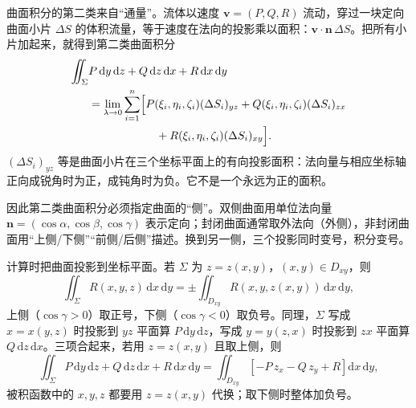 曲面积分的第二类来自“通量”。流体以速度 $\mathbf v=(P,Q,R)$ 流动，穿过一块定向曲面小片 $\Delta S$ 的体积流量，等于速度在法向的投影乘以面积：$\mathbf v\cdot\mathbf n\,\Delta S$。把所有小片加起来，就得到第二类曲面积分
\[
    \begin{aligned}
    \iint_\Sigma &P\,\mathrm dy\,\mathrm dz
    +Q\,\mathrm dz\,\mathrm dx
    +R\,\mathrm dx\,\mathrm dy\\
    &=\lim_{\lambda\to0}\sum_{i=1}^{n}
    \Bigl[P(\xi_i,\eta_i,\zeta_i)(\Delta S_i)_{yz}
    +Q(\xi_i,\eta_i,\zeta_i)(\Delta S_i)_{zx}\\
    &\qquad\qquad\qquad
    +R(\xi_i,\eta_i,\zeta_i)(\Delta S_i)_{xy}\Bigr].
    \end{aligned}
\]
$(\Delta S_i)_{yz}$ 等是曲面小片在三个坐标平面上的有向投影面积：法向量与相应坐标轴正向成锐角时为正，成钝角时为负。它不是一个永远为正的面积。

因此第二类曲面积分必须指定曲面的“侧”。双侧曲面用单位法向量 $\mathbf n=(\cos\alpha,\cos\beta,\cos\gamma)$ 表示定向；封闭曲面通常取外法向（外侧），非封闭曲面用“上侧/下侧”“前侧/后侧”描述。换到另一侧，三个投影同时变号，积分变号。

计算时把曲面投影到坐标平面。若 $\Sigma$ 为 $z=z(x,y)$，$(x,y)\in D_{xy}$，则
\[
    \iint_\Sigma R(x,y,z)\,\mathrm dx\,\mathrm dy
    =\pm\iint_{D_{xy}}R(x,y,z(x,y))\,\mathrm dx\,\mathrm dy ,
\]
上侧（$\cos\gamma>0$）取正号，下侧（$\cos\gamma<0$）取负号。同理，$\Sigma$ 写成 $x=x(y,z)$ 时投影到 $yz$ 平面算 $P\,\mathrm dy\,\mathrm dz$，写成 $y=y(z,x)$ 时投影到 $zx$ 平面算 $Q\,\mathrm dz\,\mathrm dx$。三项合起来，若用 $z=z(x,y)$ 且取上侧，则
\[
    \iint_\Sigma P\,\mathrm dy\,\mathrm dz+Q\,\mathrm dz\,\mathrm dx+R\,\mathrm dx\,\mathrm dy
    =\iint_{D_{xy}}
    \left[-P\,z_x-Q\,z_y+R\right]\mathrm dx\,\mathrm dy ,
\]
被积函数中的 $x,y,z$ 都要用 $z=z(x,y)$ 代换；取下侧时整体加负号。

